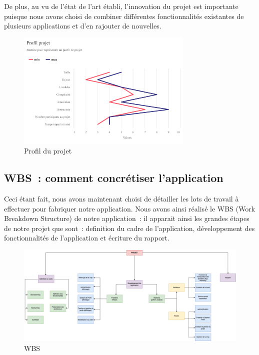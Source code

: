 \documentclass[french,a4paper]{article}
\begin{document}
De plus, au vu de l’état de l’art établi, l’innovation du projet est importante puisque nous avons choisi de combiner différentes fonctionnalités existantes de plusieurs applications et d’en rajouter de nouvelles.

\begin{figure}[H]
    \centering
    \includegraphics[width=0.75\textwidth]{img/profil_projet.png}
    \caption{Profil du projet}
\end{figure}

\subsection{WBS~: comment concrétiser l’application}
Ceci étant fait, nous avons maintenant choisi de détailler les lots de travail à effectuer pour fabriquer notre application. Nous avons ainsi réalisé le WBS (Work Breakdown Structure) de notre application~: il apparait ainsi les grandes étapes de notre projet que sont~: definition du cadre de l’application, développement des fonctionnalités de l’application et écriture du rapport.
\begin{figure}[H]
    \centering
    \includegraphics[width=1\textwidth]{img/WBS.png}
    \caption{WBS}
\end{figure}
\end{document}
